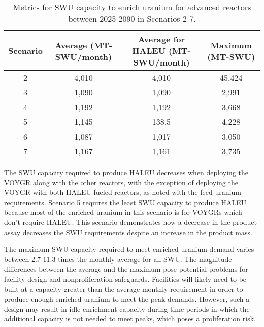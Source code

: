 \begin{table}
    \centering 
    \caption{Metrics for \gls{SWU} capacity to enrich uranium for 
    advanced reactors between 2025-2090 in Scenarios 2-7.}
    \label{tab:nogrowth_swu}
    \begin{tabular}{c c c c}
        \hline
        Scenario & Average  (MT-SWU/month) & Average
        for \gls{HALEU} (MT-SWU/month) & Maximum (MT-SWU)\\\hline
        2 & 4,010 & 4,010 & 45,424 \\
        3 & 1,090 & 1,090 & 2,991\\
        4 & 1,192 & 1,192 & 3,668\\
        5 & 1,145 & 138.5 & 4,228 \\
        6 & 1,087 & 1,017 & 3,050\\
        7 & 1,167 & 1,161 & 3,735\\
        \hline
    \end{tabular}
\end{table}

The \gls{SWU} capacity required to produce \gls{HALEU} decreases when 
deploying the VOYGR along with the other reactors, with the exception 
of deploying the VOYGR with both \gls{HALEU}-fueled reactors, as noted 
with the feed uranium requirements. 
Scenario 5 requires the least \gls{SWU} capacity to produce 
\gls{HALEU} because most of the enriched uranium in this 
scenario is for VOYGRs which don't require \gls{HALEU}. This 
scenario demonstrates how a decrease in the product assay decreases 
the \gls{SWU} requirements despite an increase in the product mass. 

The maximum \gls{SWU} capacity required to meet enriched uranium demand 
varies between 2.7-11.3 times the monthly average for all \gls{SWU}. 
The magnitude differences between the average and the maximum pose potential 
problems for facility design and nonproliferation safeguards. Facilities 
will likely need to be built at a capacity greater than the average 
monthly requirement in order to produce enough enriched uranium to meet 
the peak demands. However, such a design may result in idle enrichment 
capacity during time periods in which the additional capacity is 
not needed to meet peaks, which poses a proliferation risk. 

